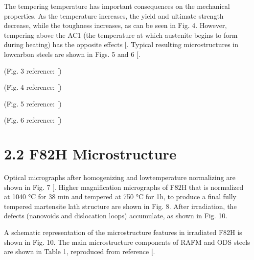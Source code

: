 \documentclass[letterpaper,10pt,english]{jupyterBook}
\begin{document}
	\sphinxAtStartPar
	The tempering temperature has important consequences on the mechanical properties. As the temperature increases, the yield and ultimate strength decrease, while the toughness increases, as can be seen in Fig. 4. However, tempering above the AC1 (the temperature at which austenite begins to form during heating) has the opposite effects {[}\sphinxhref{https://drive.google.com/file/d/1IJeZsSsMBvBOQDX5hp0cEcUCtYcLqHi1/view?usp=drive\_link}{Haarmann1999}{]}. Typical resulting microstructures in low\sphinxhyphen{}carbon steels are shown in Figs. 5 and 6 {[}\sphinxhref{https://drive.google.com/file/d/1GZY7BvsYxI80uQMH2p1Ek8GNcI5O\_MXY/view?usp=drive\_link}{Chakraborty2022}{]}.
	
	
	
	\sphinxAtStartPar
	(Fig. 3 reference: {[}\sphinxhref{https://drive.google.com/file/d/1Hm93fNos3Bji8GgYPObgblBjLQOy8dOF/view?usp=drive\_link}{Tan2016}{]})
	
	
	
	\sphinxAtStartPar
	(Fig. 4 reference: {[})
	
	
	
	\sphinxAtStartPar
	(Fig. 5 reference: {[}\sphinxhref{https://drive.google.com/file/d/1GZY7BvsYxI80uQMH2p1Ek8GNcI5O\_MXY/view?usp=drive\_link}{Chakraborty2022}{]})
	
	
	
	\sphinxAtStartPar
	(Fig. 6 reference: {[}\sphinxhref{https://drive.google.com/file/d/1GZY7BvsYxI80uQMH2p1Ek8GNcI5O\_MXY/view?usp=drive\_link}{Chakraborty2022}{]})
	
	
	\section{2.2 F82H Microstructure}
	\label{\detokenize{2 Fabrication and Microstructure:f82h-microstructure}}
	\sphinxAtStartPar
	Optical micrographs after homogenizing and low\sphinxhyphen{}temperature normalizing are shown in Fig. 7 {[}\sphinxhref{https://drive.google.com/file/d/1Gq1qIfKCPejoafHdz0Wc90ZPk-645Is\_/view?usp=drive\_link}{Hirose2004}{]}. Higher magnification micrographs of F82H that is normalized at 1040 °C for 38 min and tempered at 750 °C for 1h, to produce a final fully tempered martensite lath structure are shown in Fig. 8. After irradiation, the defects (nano\sphinxhyphen{}voids and dislocation loops) accumulate, as shown in Fig. 10.
	
	\sphinxAtStartPar
	A schematic representation of the microstructure features in irradiated F82H is shown in Fig. 10. The main microstructure components of RAFM and ODS steels are shown in Table 1, reproduced from reference {[}\sphinxhref{https://drive.google.com/file/d/1Hm93fNos3Bji8GgYPObgblBjLQOy8dOF/view?usp=drive\_link}{Tan2016}{]}.
	
\end{document}
